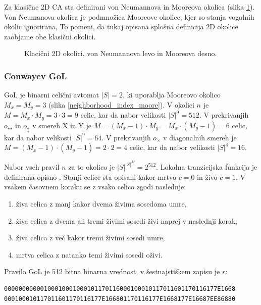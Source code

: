 \documentclass[12pt,a4paper,openany,twoside]{book}
\begin{document}
Za klasične 2D CA sta definirani von Neumannova in Mooreova okolica (slika \ref{neighborhood_classic}).
Von Neumanova okolica je podmnožica Mooreove okolice, kjer so stanja vogalnih okolic ignorirana,
To pomeni, da tukaj opisana splošna definicija 2D okolice zaobjame obe klasični okolici.

\begin{figure}[htb]
\centerline{}
\caption[Klasične 2D okolice.]
{Klacični 2D okolici, von Neumannova levo in Mooreova desno.}
\label{neighborhood_classic}
\end{figure}

\subsubsection{Conwayev GoL}

GoL je binarni celični avtomat \(|S|=2\), ki uporablja Mooreovo okolico \(M_x=M_y=3\) (slika \ref{neighborhood_index_moore}).
V okolici \(n\) je \(M=M_x \cdot M_y=3 \cdot 3=9\) celic, kar da nabor velikosti \(|S|^9=512\).
V prekrivanjih \(o_{\leftrightarrow}\) in \(o_{\updownarrow}\) v smereh X in Y
je \(M=(M_x-1) \cdot M_y=M_x \cdot (M_y-1)=6\) celic, kar da nabor velikosti \(|S|^9=64\).
V prekrivanjih \(o_{\times}\) v diagonalnih smereh
je \(M=(M_x-1) \cdot (M_y-1)=2 \cdot 2=4\) celic, kar da nabor velikosti \(|S|^4=16\).

Nabor vseh pravil \(n\) za to okolico je \(|S|^{|S|^{M}}=2^{512}\).
Lokalna tranzicijska funkcija je definirana opisno \cite{WikiGoL}.
Stanji celice sta opisani kakor mrtvo \(c=0\) in živo \(c=1\).
V vsakem časovnem koraku se z vsako celico zgodi naslednje:
\begin{enumerate}
\item živa celica z manj kakor dvema živima sosedoma umre,
\item živa celica z dvema ali tremi živimi sosedi živi naprej v naslednji korak,
\item živa celica z več kakor tremi živimi sosedi umre,
\item mrtva celica z natanko temi živimi sosedi oživi.
\end{enumerate}
Pravilo GoL je 512 bitna binarna vrednost, v šestnajstiškem zapisu je \(r\):
\begin{verbatim}
00000000000100010001000101170116000100010117011601170116177E1668
000100010117011601170116177E166801170116177E1668177E16687EE86880
\end{verbatim}
\end{document}
